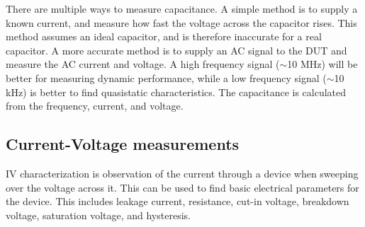\documentclass[../main/thesis.tex]{subfiles}
\begin{document}
There are multiple ways to measure capacitance. A simple method is to supply a known current, and measure how fast the voltage across the capacitor rises. This method assumes an ideal capacitor, and is therefore inaccurate for a real capacitor. A more accurate method is to supply an AC signal to the \gls{DUT} and measure the AC current and voltage. A high frequency signal ($\sim$10 MHz) will be better for measuring dynamic performance, while a low frequency signal ($\sim$10 kHz) is better to find quasistatic characteristics. The capacitance is calculated from the frequency, current, and voltage. 

\subsection{Current-Voltage measurements}
\label{t-iv}
\gls{IV} characterization is observation of the current through a device when sweeping over the voltage across it. This can be used to find basic electrical parameters for the device. This includes leakage current, resistance, cut-in voltage, breakdown voltage, saturation voltage, and hysteresis. 
\end{document}
